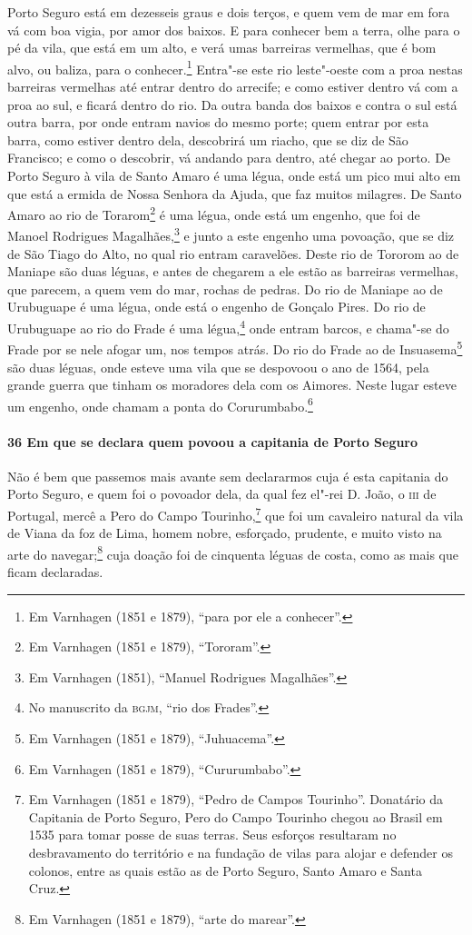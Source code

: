 \begin{linenumbers}
Porto Seguro está em dezesseis graus e dois terços, e quem vem de mar em fora vá com boa
vigia, por amor dos baixos. E para conhecer bem a terra, olhe para o pé da vila, que está
em um alto, e verá umas barreiras vermelhas, que é bom alvo, ou baliza, para o
conhecer.\footnote{ Em Varnhagen (1851 e 1879), ``para por ele a conhecer''.} Entra"-se
este rio leste"-oeste com a proa nestas barreiras vermelhas até entrar dentro do arrecife;
e como estiver dentro vá com a proa ao sul, e ficará dentro do rio. Da outra banda dos
baixos e contra o sul está outra barra, por onde entram navios do mesmo porte; quem entrar
por esta barra, como estiver dentro dela, descobrirá um riacho, que se diz de São
Francisco; e como o descobrir, vá andando para dentro, até chegar ao porto. De Porto
Seguro à vila de Santo Amaro é uma légua, onde está um pico mui alto em que está a ermida
de Nossa Senhora da Ajuda, que faz muitos milagres. De Santo Amaro ao rio de
Torarom\footnote{ Em Varnhagen (1851 e 1879), ``Tororam''.} é uma légua, onde está um
engenho, que foi de Manoel Rodrigues Magalhães,\footnote{ Em Varnhagen (1851), ``Manuel
Rodrigues Magalhães''.} e junto a este engenho uma povoação, que se diz de São Tiago do
Alto, no qual rio entram caravelões. Deste rio de Tororom ao de Maniape são duas léguas, e
antes de chegarem a ele estão as barreiras vermelhas, que parecem, a quem vem do mar,
rochas de pedras. Do rio de Maniape ao de Urubuguape é uma légua, onde está o engenho de
Gonçalo Pires. Do rio de Urubuguape ao rio do Frade é uma légua,\footnote{ No manuscrito
da \textsc{bgjm}, ``rio dos Frades''.} onde entram barcos, e chama"-se do Frade por se nele
afogar um, nos tempos atrás. Do rio do Frade ao de Insuasema\footnote{ Em Varnhagen (1851
e 1879), ``Juhuacema''.} são duas léguas, onde esteve uma vila que se despovoou o ano de
1564, pela grande guerra que tinham os moradores dela com os Aimores. Neste lugar esteve
um engenho, onde chamam a ponta do Corurumbabo.\footnote{ Em Varnhagen (1851 e 1879),
``Cururumbabo''.}

\paragraph{36 Em que se declara quem povoou a capitania de Porto Seguro} \quad
Não é bem que passemos mais avante sem declararmos cuja é esta capitania do Porto Seguro,
e quem foi o povoador dela, da qual fez el"-rei D. João, o \textsc{iii} de Portugal, mercê
a Pero do Campo Tourinho,\footnote{ Em Varnhagen (1851 e 1879), ``Pedro de Campos
Tourinho''. Donatário da Capitania de Porto Seguro, Pero do Campo Tourinho chegou ao
Brasil em 1535 para tomar posse de suas terras. Seus esforços resultaram no desbravamento
do território e na fundação de vilas para alojar e defender os colonos, entre as quais
estão as de Porto Seguro, Santo Amaro e Santa Cruz.} que foi um cavaleiro natural da vila
de Viana da foz de Lima, homem nobre, esforçado, prudente, e muito visto na arte do
navegar;\footnote{ Em Varnhagen (1851 e 1879), ``arte do marear''.} cuja doação foi de
cinquenta léguas de costa, como as mais que ficam declaradas.


\end{linenumbers}
